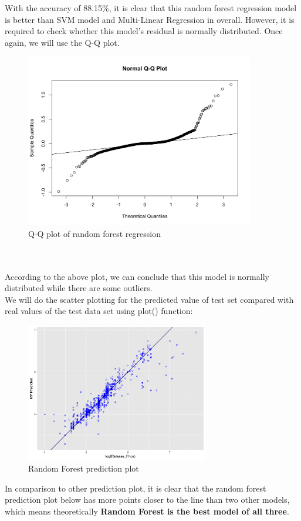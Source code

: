 \documentclass[a4paper]{article}
\theoremstyle{definition}
\begin{document}
With the accuracy of 88.15\%, it is clear that this random forest regression model is better than SVM model and Multi-Linear Regression in overall. However, it is required to check whether this model's residual is normally distributed. Once again, we will use the Q-Q plot.
\begin{figure}[h!]
\begin{center}
\includegraphics[width=10cm]{images/qqplot_rfr.png}
\end{center}
\caption{Q-Q plot of random forest regression}
\end{figure}
\\
\\
According to the above plot, we can conclude that this model is normally distributed while there are some outliers.\\
We will do the scatter plotting for the predicted value of test set compared with real values of
the test data set using plot() function:\\

\begin{figure}[h!]
\begin{center}
\includegraphics[width=8cm]{images/scatter_rfr.png}
\end{center}
\caption{Random Forest prediction plot}
\end{figure}
In comparison to other prediction plot, it is clear that the random forest prediction plot below has more points closer to the line than two other models, which means theoretically \textbf{Random Forest is the best model of all three}.
\pagebreak
\end{document}

